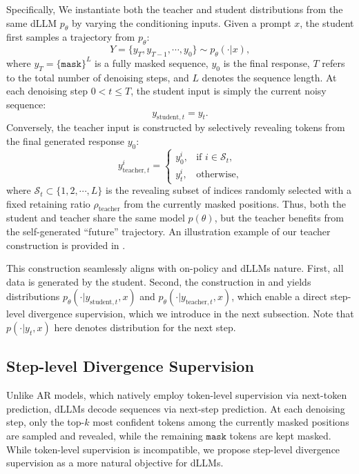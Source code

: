 \documentclass{llmxive}
\providecommand{\mask}{{\texttt{mask}}}
\begin{document}
Specifically, We instantiate both the teacher and student distributions from the same dLLM $p_\theta$ by varying the conditioning inputs. Given a prompt $x$, the student first samples a trajectory from $p_\theta$:
\begin{equation}
    Y = \{ y_T, y_{T-1}, \cdots, y_0 \} \sim p_\theta (\cdot | x),
\label{eq7}
\end{equation}
where $y_T = \{ \mask \}^L$ is a fully masked sequence, $y_0$ is the final response, $T$ refers to the total number of denoising steps, and $L$ denotes the sequence length. At each denoising step $0<t \leq T$, the student input is simply the current noisy sequence:
\begin{equation}
    y_{\text{student},t} = y_t.
\label{eq8}
\end{equation}
Conversely, the teacher input is constructed by selectively revealing tokens from the final generated response $y_0$:
\begin{equation}
y_{\text{teacher},t}^i =
\begin{cases}
y_0^i, & \text{if } i \in \mathcal{S}_t,\\[4pt]
y_t^i, & \text{otherwise},
\end{cases}
\label{eq9}
\end{equation}
where $\mathcal{S}_t \subset \{ 1, 2, \cdots, L \}$ is the revealing subset of indices randomly selected with a fixed retaining ratio $\rho_\text{teacher}$ from the currently masked positions. Thus, both the student and teacher share the same model $p(\theta)$, but the teacher benefits from the self-generated ``future'' trajectory. An illustration example of our teacher construction is provided in . 

This construction seamlessly aligns with on-policy and dLLMs nature. First, all data is generated by the student. Second, the construction in  and  yields distributions $p_\theta(\cdot | y_{\text{student}, t}, x)$ and $p_\theta(\cdot | y_{\text{teacher}, t}, x)$, which enable a direct step-level divergence supervision, which we introduce in the next subsection. Note that $p(\cdot | y_{t}, x)$ here denotes distribution for the next step.


\subsection{Step-level Divergence Supervision} \label{sec3.2}


Unlike AR models, which natively employ token-level supervision via next-token prediction, dLLMs decode sequences via next-step prediction. At each denoising step, only the top-$k$ most confident tokens among the currently masked positions are sampled and revealed, while the remaining $\mask$ tokens are kept masked. While token-level supervision is incompatible, we propose step-level divergence supervision as a more natural objective for dLLMs.
\end{document}
